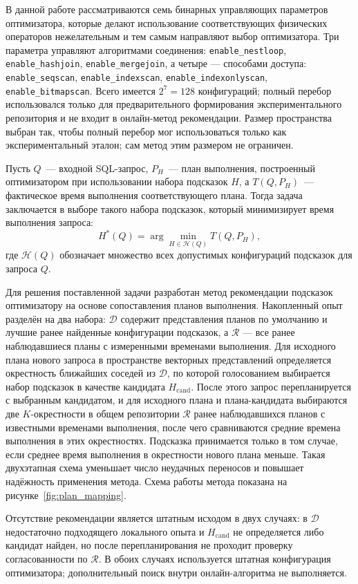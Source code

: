 В данной работе рассматриваются семь бинарных управляющих параметров оптимизатора, которые делают использование соответствующих физических операторов нежелательным и тем самым направляют выбор оптимизатора.  Три параметра управляют алгоритмами соединения: \texttt{enable\_nestloop}, \texttt{enable\_hashjoin}, \texttt{enable\_mergejoin}, а четыре --- способами доступа: \texttt{enable\_seqscan}, \texttt{enable\_indexscan}, \texttt{enable\_indexonlyscan}, \texttt{enable\_bitmapscan}. Всего имеется \(2^7=128\) конфигураций; полный перебор использовался только для предварительного формирования экспериментального репозитория и не входит в онлайн-метод рекомендации. Размер пространства выбран так, чтобы полный перебор мог использоваться только как экспериментальный эталон; сам метод этим размером не ограничен.

Пусть \(Q\)~--- входной SQL-запрос, \(P_H\)~--- план выполнения, построенный оптимизатором при использовании набора подсказок \(H\), а \(T(Q, P_H)\)~--- фактическое время выполнения соответствующего плана. Тогда задача заключается в выборе такого набора подсказок, который минимизирует время выполнения запроса:
\[
H^{*}(Q)=\arg\min_{H \in \mathcal{H}(Q)} T(Q, P_H),
\]
где \(\mathcal{H}(Q)\) обозначает множество всех допустимых конфигураций подсказок для запроса \(Q\).

Для решения поставленной задачи разработан метод рекомендации подсказок
оптимизатору на основе сопоставления планов выполнения. Накопленный опыт разделён на два набора: \(\mathcal{D}\) содержит представления планов по умолчанию и лучшие ранее найденные конфигурации подсказок, а \(\mathcal{R}\) --- все ранее наблюдавшиеся планы с измеренными временами выполнения. Для исходного плана нового запроса в пространстве векторных представлений определяется окрестность ближайших соседей из \(\mathcal{D}\), по которой голосованием выбирается набор подсказок в качестве кандидата \(H_{\mathrm{cand}}\). После этого запрос перепланируется с выбранным кандидатом, и для исходного плана и плана-кандидата выбираются две $K$-окрестности в общем репозитории  \(\mathcal{R}\) ранее наблюдавшихся планов с известными временами выполнения, после чего сравниваются средние времена выполнения в этих окрестностях. Подсказка принимается только в том случае, если среднее время выполнения в окрестности нового плана меньше. Такая двухэтапная схема уменьшает число неудачных переносов и повышает надёжность применения метода. Схема работы метода показана на рисунке~\ref{fig:plan_mapping}.

Отсутствие рекомендации является штатным исходом в двух случаях: в \(\mathcal{D}\) недостаточно подходящего локального опыта и \(H_{\mathrm{cand}}\) не определяется либо кандидат найден, но после перепланирования не проходит проверку согласованности по \(\mathcal{R}\). В обоих случаях используется штатная конфигурация оптимизатора; дополнительный поиск внутри онлайн-алгоритма не выполняется.


